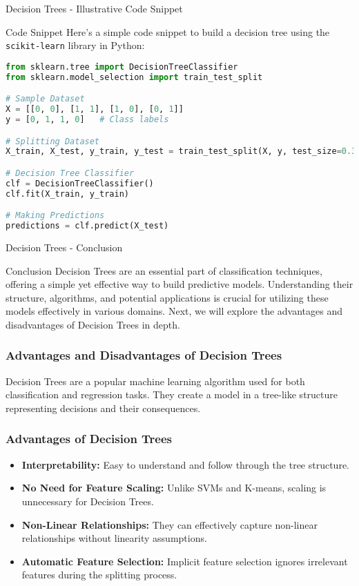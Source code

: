 \documentclass[aspectratio=169]{beamer}
\begin{document}
\begin{frame}[fragile]{Decision Trees - Illustrative Code Snippet}
    \begin{block}{Code Snippet}
        Here’s a simple code snippet to build a decision tree using the \texttt{scikit-learn} library in Python:
        \begin{lstlisting}[language=Python]
from sklearn.tree import DecisionTreeClassifier
from sklearn.model_selection import train_test_split

# Sample Dataset
X = [[0, 0], [1, 1], [1, 0], [0, 1]]
y = [0, 1, 1, 0]   # Class labels

# Splitting Dataset
X_train, X_test, y_train, y_test = train_test_split(X, y, test_size=0.3)

# Decision Tree Classifier
clf = DecisionTreeClassifier()
clf.fit(X_train, y_train)

# Making Predictions
predictions = clf.predict(X_test)
        \end{lstlisting}
    \end{block}
\end{frame}

\begin{frame}[fragile]{Decision Trees - Conclusion}
    \begin{block}{Conclusion}
        Decision Trees are an essential part of classification techniques, offering a simple yet effective way to build predictive models. 
        Understanding their structure, algorithms, and potential applications is crucial for utilizing these models effectively in various domains. 
        Next, we will explore the advantages and disadvantages of Decision Trees in depth.
    \end{block}
\end{frame}

\begin{frame}[fragile]
    \frametitle{Advantages and Disadvantages of Decision Trees}
    Decision Trees are a popular machine learning algorithm used for both classification and regression tasks. They create a model in a tree-like structure representing decisions and their consequences.
\end{frame}

\begin{frame}[fragile]
    \frametitle{Advantages of Decision Trees}
    \begin{itemize}
        \item \textbf{Interpretability:} 
        Easy to understand and follow through the tree structure.
        \item \textbf{No Need for Feature Scaling:} 
        Unlike SVMs and K-means, scaling is unnecessary for Decision Trees.
        \item \textbf{Non-Linear Relationships:} 
        They can effectively capture non-linear relationships without linearity assumptions.
        \item \textbf{Automatic Feature Selection:} 
        Implicit feature selection ignores irrelevant features during the splitting process.
    \end{itemize}
\end{frame}
\end{document}
